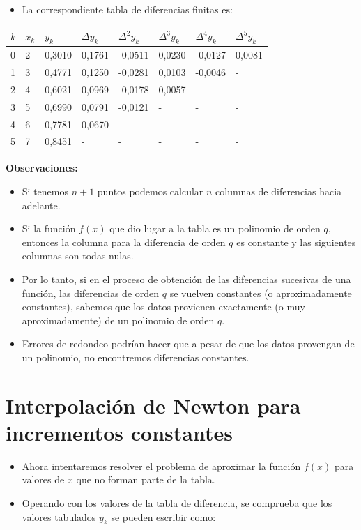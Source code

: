 \documentclass[openany]{book}
\providecommand{\tightlist}{%
  \setlength{\itemsep}{0pt}\setlength{\parskip}{0pt}}
\begin{document}
\begin{itemize}
\tightlist
\item
  La correspondiente tabla de diferencias finitas es:
\end{itemize}

\begin{longtable}[]{@{}llllllll@{}}
\toprule
\(k\) & \(x_k\) & \(y_k\) & \(\Delta y_k\) & \(\Delta^2 y_k\) & \(\Delta^3 y_k\) & \(\Delta^4 y_k\) & \(\Delta^5 y_k\)\tabularnewline
\midrule
\endhead
0 & 2 & 0,3010 & 0,1761 & -0,0511 & 0,0230 & -0,0127 & 0,0081\tabularnewline
1 & 3 & 0,4771 & 0,1250 & -0,0281 & 0,0103 & -0,0046 & -\tabularnewline
2 & 4 & 0,6021 & 0,0969 & -0,0178 & 0,0057 & - & -\tabularnewline
3 & 5 & 0,6990 & 0,0791 & -0,0121 & - & - & -\tabularnewline
4 & 6 & 0,7781 & 0,0670 & - & - & - & -\tabularnewline
5 & 7 & 0,8451 & - & - & - & - & -\tabularnewline
\bottomrule
\end{longtable}

\textbf{Observaciones:}

\begin{itemize}
\tightlist
\item
  Si tenemos \(n+1\) puntos podemos calcular \(n\) columnas de diferencias hacia adelante.
\item
  Si la función \(f(x)\) que dio lugar a la tabla es un polinomio de orden \(q\), entonces la columna para la diferencia de orden \(q\) es constante y las siguientes columnas son todas nulas.
\item
  Por lo tanto, si en el proceso de obtención de las diferencias sucesivas de una función, las diferencias de orden \(q\) se vuelven constantes (o aproximadamente constantes), sabemos que los datos provienen exactamente (o muy aproximadamente) de un polinomio de orden \(q\).
\item
  Errores de redondeo podrían hacer que a pesar de que los datos provengan de un polinomio, no encontremos diferencias constantes.
\end{itemize}

\hypertarget{interpolaciuxf3n-de-newton-para-incrementos-constantes}{%
\section{Interpolación de Newton para incrementos constantes}\label{interpolaciuxf3n-de-newton-para-incrementos-constantes}}

\begin{itemize}
\tightlist
\item
  Ahora intentaremos resolver el problema de aproximar la función \(f(x)\) para valores de \(x\) que no forman parte de la tabla.
\item
  Operando con los valores de la tabla de diferencia, se comprueba que los valores tabulados \(y_k\) se pueden escribir como:
\end{itemize}
\end{document}
